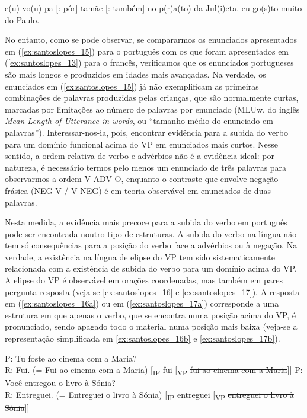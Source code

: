 \documentclass[output=paper]{LSP/langsci}
\begin{document}
\ea\label{ex:santoslopes_15}
\ea\label{ex:santoslopes_15a}
e(u) vo(u) pa [: pôr] tamãe [: também] no p(r)a(to) da Jul(i)eta.
\ex\label{ex:santoslopes_15b}
eu go(s)to muito do Paulo.
\zl

No entanto, como se pode observar, se compararmos os enunciados apresentados em (\ref{ex:santoslopes_15}) para o português com os que foram apresentados em (\ref{ex:santoslopes_13}) para o francês, verificamos que os enunciados portugueses são mais longos e produzidos em idades mais avançadas. Na verdade, os enunciados em (\ref{ex:santoslopes_15}) já não exemplificam as primeiras combinações de palavras produzidas pelas crianças, que são normalmente curtas, marcadas por limitações ao número de palavras por enunciado (MLUw, do inglês \textit{Mean Length of Utterance in words}, ou “tamanho médio do enunciado em palavras”). Interessar-nos-ia, pois, encontrar evidência para a subida do verbo para um domínio funcional acima do VP em enunciados mais curtos. Nesse sentido, a ordem relativa de verbo e advérbios não é a evidência ideal: por natureza, é necessário termos pelo menos um enunciado de três palavras para observarmos a ordem V ADV O, enquanto o contraste que envolve negação frásica (NEG V / V NEG) é em teoria observável em enunciados de duas palavras.

Nesta medida, a evidência mais precoce para a subida do verbo em português pode ser encontrada noutro tipo de estruturas. A subida do verbo na língua não tem só consequências para a posição do verbo face a advérbios ou à negação. Na verdade, a existência na língua de elipse do VP tem sido sistematicamente relacionada com a existência de subida do verbo para um domínio acima do VP. A elipse do VP é observável em orações coordenadas, mas também em pares pergunta-resposta (veja-se \ref{ex:santoslopes_16} e \ref{ex:santoslopes_17}). A resposta em (\ref{ex:santoslopes_16a}) ou em (\ref{ex:santoslopes_17a}) corresponde a uma estrutura em que apenas o verbo, que se encontra numa posição acima do VP, é pronunciado, sendo apagado todo o material numa posição mais baixa (veja-se a representação simplificada em \ref{ex:santoslopes_16b} e \ref{ex:santoslopes_17b}).

\ea\label{ex:santoslopes_16}
\ea\label{ex:santoslopes_16a}
P: Tu foste ao cinema com a Maria?\\
R: Fui. (= Fui ao cinema com a Maria)
\ex\label{ex:santoslopes_16b}
[\textsubscript{IP} fui [\textsubscript{VP} \sout{fui ao cinema com a Maria}]]
\zl
\ea\label{ex:santoslopes_17}
\ea\label{ex:santoslopes_17a}
P: Você entregou o livro à Sónia?\\
R: Entreguei. (= Entreguei o livro à Sónia)
\ex\label{ex:santoslopes_17b}
[\textsubscript{IP} entreguei [\textsubscript{VP} \sout{entreguei o livro à Sónia}]]
\zl
\end{document}
